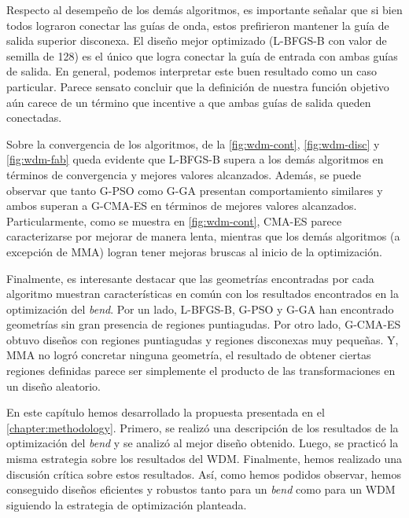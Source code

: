 Respecto al desempeño de los demás algoritmos, es importante señalar que si bien todos lograron
conectar las guías de onda, estos prefirieron mantener la guía de salida superior disconexa.
El diseño mejor optimizado (L-BFGS-B con valor de semilla de 128) es el único que logra conectar
la guía de entrada con ambas guías de salida.
En general, podemos interpretar este buen resultado como un caso particular.
Parece sensato concluir que la definición de nuestra función objetivo aún carece de un
término que incentive a que ambas guías de salida queden conectadas.


Sobre la convergencia de los algoritmos, de la \autoref{fig:wdm-cont}, \autoref{fig:wdm-disc}
y \autoref{fig:wdm-fab} queda evidente que L-BFGS-B supera a los demás algoritmos en términos
de convergencia y mejores valores alcanzados.
Además, se puede observar que tanto G-PSO como G-GA presentan comportamiento similares y ambos
superan a G-CMA-ES en términos de mejores valores alcanzados.
Particularmente, como se muestra en \autoref{fig:wdm-cont}, CMA-ES parece caracterizarse
por mejorar de manera lenta, mientras que los demás algoritmos (a excepción de MMA) logran tener
mejoras bruscas al inicio de la optimización.


Finalmente, es interesante destacar que las geometrías encontradas por cada algoritmo muestran
características en común con los resultados encontrados en la optimización del \emph{bend}.
Por un lado, L-BFGS-B, G-PSO y G-GA han encontrado geometrías sin gran presencia de regiones puntiagudas.
Por otro lado, G-CMA-ES obtuvo diseños con regiones puntiagudas y regiones disconexas muy pequeñas.
Y, MMA no logró concretar ninguna geometría, el resultado de obtener ciertas regiones definidas parece
ser simplemente el producto de las transformaciones en un diseño aleatorio.


En este capítulo hemos desarrollado la propuesta presentada en el \autoref{chapter:methodology}.
Primero, se realizó una descripción de los resultados de la optimización del \emph{bend} y 
se analizó al mejor diseño obtenido. 
Luego, se practicó la misma estrategia sobre los resultados del WDM.
Finalmente, hemos realizado una discusión crítica sobre estos resultados.
Así, como hemos podidos observar, hemos conseguido diseños eficientes y robustos tanto para un \emph{bend}
como para un WDM siguiendo la estrategia de optimización planteada.
